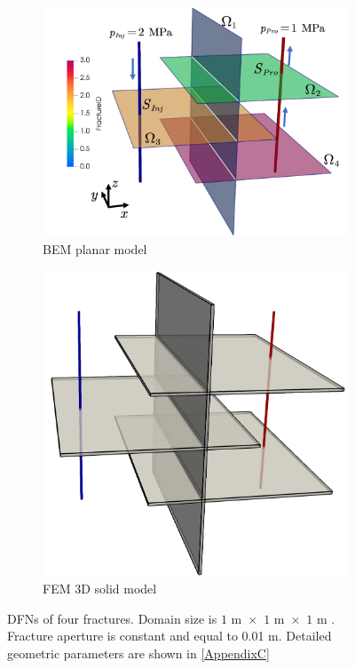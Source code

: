 \documentclass[num-refs]{wiley-networks}
\begin{document}
\begin{figure}
\centering
     \begin{subfigure}[b]{0.45\textwidth}
         \centering
         \includegraphics[width=\textwidth]{Case3_Domain.pdf}
         \caption{BEM planar model}
     \end{subfigure}
\quad
     \begin{subfigure}[b]{0.33\textwidth}
         \centering
         \includegraphics[width=\textwidth]{Case3_FEMDomain_c.png}
         \caption{FEM 3D solid model}
     \end{subfigure}
\label{fig:Case3_Domain}
\caption{DFNs of four fractures. Domain size is $\text{1 m }\times \,\,\text{1 m }\times \,\,\text{1 m }
$. Fracture aperture is constant and equal to 0.01 m. Detailed geometric parameters are shown in \ref{AppendixC}}
\end{figure}
\end{document}
